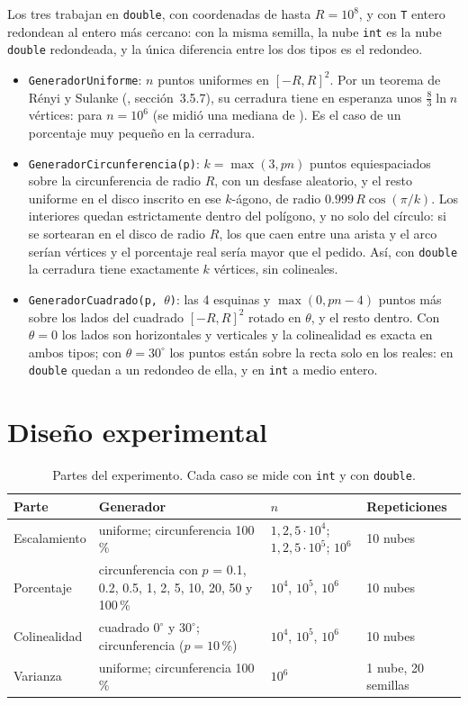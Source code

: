 \documentclass[11pt,letterpaper]{article}
\newcommand{\code}[1]{\texttt{#1}}
\begin{document}
Los tres trabajan en \code{double}, con coordenadas de hasta $R=10^8$, y con
\code{T} entero redondean al entero más cercano: con la misma semilla, la nube
\code{int} es la nube \code{double} redondeada, y la única diferencia entre los
dos tipos es el redondeo.

\begin{itemize}
  \item \code{GeneradorUniforme}: $n$ puntos uniformes en $[-R,R]^2$. Por un
        teorema de Rényi y Sulanke (\cite{orourke}, sección~3.5.7), su
        cerradura tiene en esperanza unos $\tfrac{8}{3}\ln n$ vértices:
        \resUniHEsperado{} para $n=10^6$ (se midió una mediana de \resUniH).
        Es el caso de un porcentaje muy pequeño en la cerradura.
  \item \code{GeneradorCircunferencia(p)}: $k=\max(3,pn)$ puntos equiespaciados
        sobre la circunferencia de radio $R$, con un desfase aleatorio, y el
        resto uniforme en el disco inscrito en ese $k$-ágono, de radio
        $0.999\,R\cos(\pi/k)$. Los interiores quedan estrictamente dentro del
        polígono, y no solo del círculo: si se sortearan en el disco de radio
        $R$, los que caen entre una arista y el arco serían vértices y el
        porcentaje real sería mayor que el pedido. Así, con \code{double} la
        cerradura tiene exactamente $k$ vértices, sin colineales.
  \item \code{GeneradorCuadrado(p, $\theta$)}: las 4 esquinas y $\max(0,pn-4)$
        puntos más sobre los lados del cuadrado $[-R,R]^2$ rotado en $\theta$, y
        el resto dentro. Con $\theta=0$ los lados son horizontales y verticales
        y la colinealidad es exacta en ambos tipos; con $\theta=30^\circ$ los
        puntos están sobre la recta solo en los reales: en \code{double} quedan a
        un redondeo de ella, y en \code{int} a medio entero.
\end{itemize}

\section{Diseño experimental}

\begin{table}[!htbp]
\centering
\caption{Partes del experimento. Cada caso se mide con \code{int} y con
  \code{double}.}
\label{tab:diseno}
\small
\begin{tabularx}{\linewidth}{@{}lXll@{}}
\toprule
Parte & Generador & $n$ & Repeticiones \\
\midrule
Escalamiento & uniforme; circunferencia 100\,\%
  & $1,2,5\cdot 10^{4}$; $1,2,5\cdot 10^{5}$; $10^{6}$ & 10 nubes \\
Porcentaje & circunferencia con $p$ = 0.1, 0.2, 0.5, 1, 2, 5, 10, 20, 50 y 100\,\%
  & $10^{4}$, $10^{5}$, $10^{6}$ & 10 nubes \\
Colinealidad & cuadrado $0^\circ$ y $30^\circ$; circunferencia ($p=10$\,\%)
  & $10^{4}$, $10^{5}$, $10^{6}$ & 10 nubes \\
Varianza & uniforme; circunferencia 100\,\% & $10^{6}$ & 1 nube, 20 semillas \\
\bottomrule
\end{tabularx}
\end{table}
\end{document}
